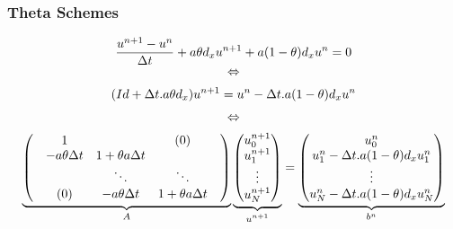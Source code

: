 \documentclass[10pt]{beamer}
\begin{document}
\begin{frame}
\frametitle{Theta Schemes}
    
\[
    \begin{array}{c}
    \displaystyle \frac{u^{n+1} - u^n}{\Delta t} + a\theta d_x u^{n+1} + a(1-\theta) d_x u^n = 0 \\
    \vspace{6pt}
    \Leftrightarrow \\
    \vspace{6pt}
    \displaystyle (Id + \Delta t . a \theta d_x)u^{n+1} = u^n - \Delta t .a(1-\theta)d_x u^n \\
    \vspace{6pt}
    \Leftrightarrow \\
    \vspace{6pt}
    
    \underbrace{
        \begin{pmatrix}
        & 1 & & (0) &\\
        & -a\theta\Delta t & 1+\theta a \Delta t & & \\
        & & \ddots & \ddots \\
        & (0) & -a\theta\Delta t & 1+\theta a \Delta t \\
        \end{pmatrix}
    }_{\text{$A$}}
    
    \underbrace{
        \begin{pmatrix}
        u_0^{n+1}\\
        u_1^{n+1}\\
        \vdots \\
        u_N^{n+1}\\
        \end{pmatrix}
    }_{\text{$u^{n+1}$}}
    =
    \underbrace{
        \begin{pmatrix}
        u_0^n\\
        u_1^n - \Delta t .a(1-\theta)d_x u_1^n\\
        \vdots \\
        u_{N}^n - \Delta t .a(1-\theta)d_x u_{N}^n\\
        \end{pmatrix}
    }_{b^n}
    \end{array}
    \]
\end{frame}
\end{document}
